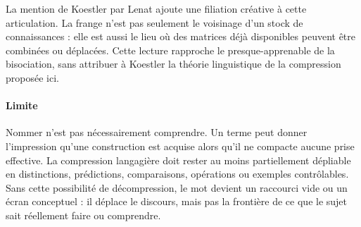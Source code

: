 \documentclass[10pt,a4paper]{article}
\begin{document}
La mention de Koestler par Lenat ajoute une filiation créative à cette articulation. La frange n'est pas seulement le voisinage d'un stock de connaissances : elle est aussi le lieu où des matrices déjà disponibles peuvent être combinées ou déplacées. Cette lecture rapproche le presque-apprenable de la bisociation, sans attribuer à Koestler la théorie linguistique de la compression proposée ici.

\paragraph{Limite}
Nommer n'est pas nécessairement comprendre. Un terme peut donner l'impression qu'une construction est acquise alors qu'il ne compacte aucune prise effective. La compression langagière doit rester au moins partiellement dépliable en distinctions, prédictions, comparaisons, opérations ou exemples contrôlables. Sans cette possibilité de décompression, le mot devient un raccourci vide ou un écran conceptuel : il déplace le discours, mais pas la frontière de ce que le sujet sait réellement faire ou comprendre.
\end{document}

